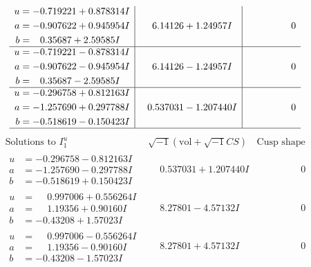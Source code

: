 \documentclass[1p]{elsarticle_modified}
\theoremstyle{definition}
\newcommand{\I}{\sqrt{-1}}
\begin{document}
$$\begin{array}{c|c|c}
\begin{aligned}
u &= -0.719221 + 0.878314 I \\
a &= -0.907622 + 0.945954 I \\
b &= \phantom{-}0.35687 + 2.59585 I\end{aligned}
 & \phantom{-}6.14126 + 1.24957 I & \phantom{-0.000000 } 0 \\ \hline\begin{aligned}
u &= -0.719221 - 0.878314 I \\
a &= -0.907622 - 0.945954 I \\
b &= \phantom{-}0.35687 - 2.59585 I\end{aligned}
 & \phantom{-}6.14126 - 1.24957 I & \phantom{-0.000000 } 0 \\ \hline\begin{aligned}
u &= -0.296758 + 0.812163 I \\
a &= -1.257690 + 0.297788 I \\
b &= -0.518619 - 0.150423 I\end{aligned}
 & \phantom{-}0.537031 - 1.207440 I & \phantom{-0.000000 } 0\\
 \hline 
 \end{array}$$\newpage$$\begin{array}{c|c|c}  
\text{Solutions to }I^u_{1}& \I (\text{vol} + \sqrt{-1}CS) & \text{Cusp shape}\\
 \hline 
\begin{aligned}
u &= -0.296758 - 0.812163 I \\
a &= -1.257690 - 0.297788 I \\
b &= -0.518619 + 0.150423 I\end{aligned}
 & \phantom{-}0.537031 + 1.207440 I & \phantom{-0.000000 } 0 \\ \hline\begin{aligned}
u &= \phantom{-}0.997006 + 0.556264 I \\
a &= \phantom{-}1.19356 + 0.90160 I \\
b &= -0.43208 + 1.57023 I\end{aligned}
 & \phantom{-}8.27801 - 4.57132 I & \phantom{-0.000000 } 0 \\ \hline\begin{aligned}
u &= \phantom{-}0.997006 - 0.556264 I \\
a &= \phantom{-}1.19356 - 0.90160 I \\
b &= -0.43208 - 1.57023 I\end{aligned}
 & \phantom{-}8.27801 + 4.57132 I & \phantom{-0.000000 } 0 \\ \hline\begin{aligned}

\end{aligned}
\end{array}$$
\end{document}
